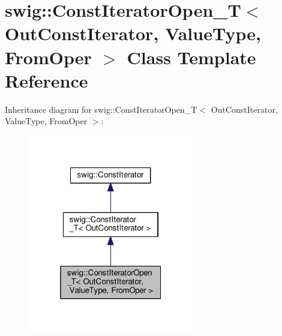 \hypertarget{classswig_1_1ConstIteratorOpen__T}{}\section{swig\+:\+:Const\+Iterator\+Open\+\_\+T$<$ Out\+Const\+Iterator, Value\+Type, From\+Oper $>$ Class Template Reference}
\label{classswig_1_1ConstIteratorOpen__T}


Inheritance diagram for swig\+:\+:Const\+Iterator\+Open\+\_\+T$<$ Out\+Const\+Iterator, Value\+Type, From\+Oper $>$\+:
\nopagebreak
\begin{figure}[H]
\begin{center}
\leavevmode
\includegraphics[width=205pt]{classswig_1_1ConstIteratorOpen__T__inherit__graph}
\end{center}
\end{figure}


